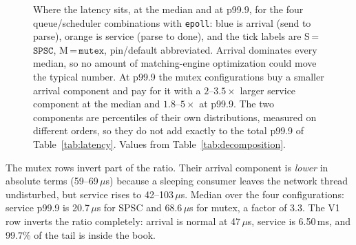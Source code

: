 \documentclass[conference]{IEEEtran}
\newcommand{\us}{\,$\mu$s}
\begin{document}
\begin{figure}[!t]
\centering
{}%
\caption{Where the latency sits, at the median and at p99.9, for the four
queue/scheduler combinations with \texttt{epoll}: blue is arrival (send to
parse), orange is service (parse to done), and the tick labels are
S\,=\,$\texttt{SPSC}$, M\,=\,$\texttt{mutex}$, pin/default abbreviated.
Arrival dominates every median, so no amount of matching-engine optimization
could move the typical number. At p99.9 the mutex configurations buy a smaller
arrival component and pay for it with a $2$--$3.5\times$ larger service
component at the median and $1.8$--$5\times$ at p99.9. The two components are
percentiles of their own distributions, measured on different orders, so they do
not add exactly to the total p99.9 of Table~\ref{tab:latency}. Values from
Table~\ref{tab:decomposition}.}
\label{fig:split}
\end{figure}

The mutex rows invert part of the ratio. Their arrival component is \emph{lower}
in absolute terms (59--69\us) because a sleeping consumer leaves the network
thread undisturbed, but service rises to 42--103\us. Median over the four
configurations: service p99.9 is 20.7\us{} for SPSC and 68.6\us{} for mutex, a
factor of 3.3. The V1 row inverts the ratio completely: arrival is normal at
47\us, service is 6.50\,ms, and 99.7\% of the tail is inside the book.
\end{document}
